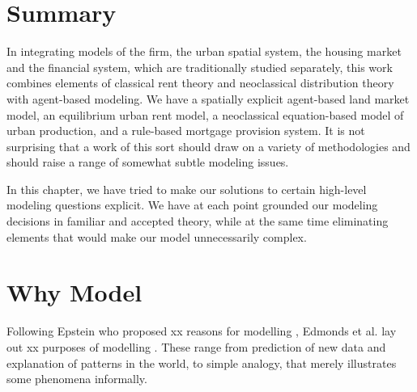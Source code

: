 




\section{Summary}
In integrating models of the firm, the urban spatial system, the housing market and the financial system,  which are traditionally studied separately, this work combines elements of classical rent theory and neoclassical distribution theory with agent-based modeling. We have a spatially explicit agent-based land market model, an equilibrium urban rent model, a neoclassical equation-based model of urban production, and a rule-based mortgage provision system. It is not surprising that a work of this sort should draw on a variety of methodologies and should raise a range of somewhat subtle modeling issues. 

In this chapter, we have tried to make our solutions to certain high-level modeling questions explicit. We have at each point grounded our modeling decisions in familiar and accepted theory, while at the same time eliminating elements that would make our model unnecessarily complex. 


\section{Why Model}
Following Epstein who proposed xx reasons for modelling \cite{epsteinWhyModel2008}, Edmonds et al. lay out xx purposes of modelling \cite{edmondsDifferentModellingPurposes2019}. These range from prediction of new data and explanation of patterns in the world, to simple analogy, that merely illustrates some phenomena informally. 


